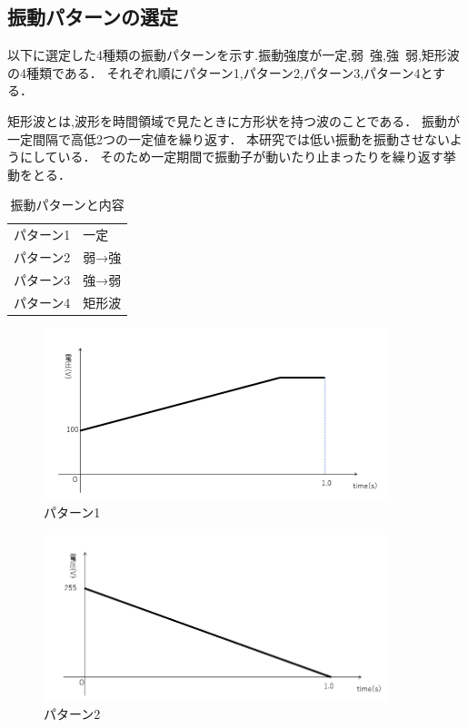 \newpage
\subsection{振動パターンの選定}
以下に選定した4種類の振動パターンを示す.振動強度が一定,弱~強,強~弱,矩形波の4種類である．
それぞれ順にパターン1,パターン2,パターン3,パターン4とする．

矩形波とは,波形を時間領域で見たときに方形状を持つ波のことである．
振動が一定間隔で高低2つの一定値を繰り返す．
本研究では低い振動を振動させないようにしている．
そのため一定期間で振動子が動いたり止まったりを繰り返す挙動をとる．

\begin{table}[H]
    \caption{\label{tab;sindou}振動パターンと内容}
    \centering
    \begin{tabular}{l|l}
    \hline
    \hline
    パターン1 & 一定\\
    パターン2 & 弱→強\\
    パターン3 & 強→弱\\
    パターン4 & 矩形波\\
    \hline
    \end{tabular}
\end{table}


\begin{figure}[h]
\centering
\includegraphics[clip,width=10cm]{./fig/patarn1.png}
\caption{パターン1}\label{patarn1}
\end{figure}

\begin{figure}[h]
\centering
\includegraphics[clip,width=10cm]{./fig/patarn2.png}
\caption{パターン2}\label{patarn2}
\end{figure}

